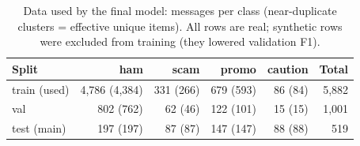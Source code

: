 \begin{table}[t]
\centering
\caption{Data used by the final model: messages per class (near-duplicate clusters = effective unique items). All rows are real; synthetic rows were excluded from training (they lowered validation F1).}
\label{tab:data}
\small
\begin{tabular}{lrrrrr}
\toprule
Split & ham & scam & promo & caution & Total \\
\midrule
train (used) & 4,786 (4,384) & 331 (266) & 679 (593) & 86 (84) & 5,882 \\
val & 802 (762) & 62 (46) & 122 (101) & 15 (15) & 1,001 \\
test (main) & 197 (197) & 87 (87) & 147 (147) & 88 (88) & 519 \\
\bottomrule
\end{tabular}
\end{table}
